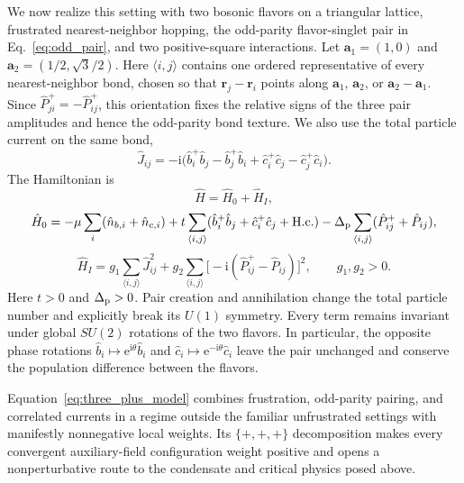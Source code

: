 \documentclass[onecolumn,aps,prb,amsmath,amssymb,superscriptaddress,longbibliography]{revtex4-2}
\newcommand{\ee}{\mathrm{e}}
\newcommand{\ii}{\mathrm{i}}
\begin{document}
We now realize this setting with two bosonic flavors on a triangular lattice, frustrated nearest-neighbor hopping, the odd-parity flavor-singlet pair in Eq.~\eqref{eq:odd_pair}, and two positive-square interactions.  Let \(\mathbf a_1=(1,0)\) and \(\mathbf a_2=(1/2,\sqrt{3}/2)\).  Here \(\langle i,j\rangle\) contains one ordered representative of every nearest-neighbor bond, chosen so that \(\mathbf r_j-\mathbf r_i\) points along \(\mathbf a_1\), \(\mathbf a_2\), or \(\mathbf a_2-\mathbf a_1\).  Since \(\hat P_{ji}^+=-\hat P_{ij}^+\), this orientation fixes the relative signs of the three pair amplitudes and hence the odd-parity bond texture.  We also use the total particle current on the same bond,
\begin{equation}
    \hat J_{ij}=-\ii\bigl(\hat b_i^+\hat b_j-\hat b_j^+\hat b_i+\hat c_i^+\hat c_j-\hat c_j^+\hat c_i\bigr).
    \label{eq:three_plus_total_current}
\end{equation}
The Hamiltonian is
\begin{equation}
    \hat H=\hat H_0+\hat H_I,
    \label{eq:three_plus_model}
\end{equation}
\begin{equation}
    \hat H_0=-\mu\sum_i(\hat n_{b,i}+\hat n_{c,i})+t\sum_{\langle i,j\rangle}(\hat b_i^+\hat b_j+\hat c_i^+\hat c_j+\mathrm{H.c.})-\Delta_{\rm p}\sum_{\langle i,j\rangle}(\hat P_{ij}^++\hat P_{ij}),
    \label{eq:three_plus_model_H0}
\end{equation}
\begin{equation}
    \hat H_I=g_1\sum_{\langle i,j\rangle}\hat J_{ij}^2+g_2\sum_{\langle i,j\rangle}\bigl[-\ii(\hat P_{ij}^+-\hat P_{ij})\bigr]^2,
    \qquad g_1,g_2>0.
    \label{eq:three_plus_model_HI}
\end{equation}
Here \(t>0\) and \(\Delta_{\rm p}>0\).  Pair creation and annihilation change the total particle number and explicitly break its \(U(1)\) symmetry.  Every term remains invariant under global \(SU(2)\) rotations of the two flavors.  In particular, the opposite phase rotations \(\hat b_i\mapsto\ee^{\ii\theta}\hat b_i\) and \(\hat c_i\mapsto\ee^{-\ii\theta}\hat c_i\) leave the pair unchanged and conserve the population difference between the flavors.

Equation~\eqref{eq:three_plus_model} combines frustration, odd-parity pairing, and correlated currents in a regime outside the familiar unfrustrated settings with manifestly nonnegative local weights.  Its \(\{+,+,+\}\) decomposition makes every convergent auxiliary-field configuration weight positive and opens a nonperturbative route to the condensate and critical physics posed above.
\end{document}

